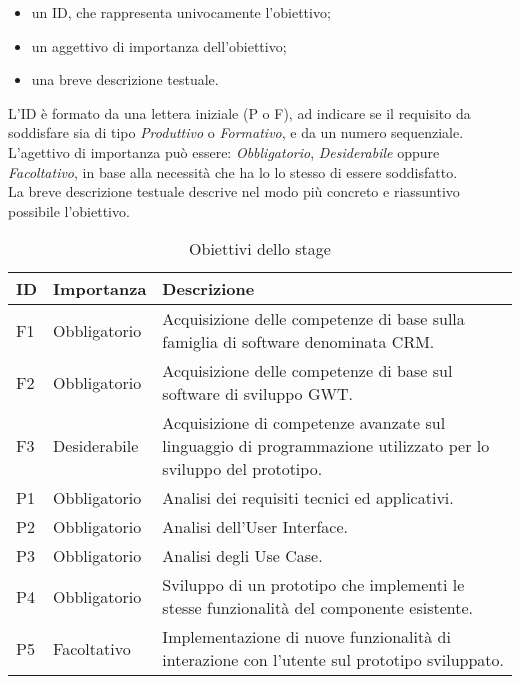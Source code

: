 \begin{itemize}
	\item un ID, che rappresenta univocamente l'obiettivo;
	\item un aggettivo di importanza dell'obiettivo;
	\item una breve descrizione testuale.
\end{itemize}

L'ID è formato da una lettera iniziale (P o F), ad indicare se il requisito da soddisfare sia di tipo \emph{Produttivo} o \emph{Formativo}, e da un numero sequenziale.\\
L'agettivo di importanza può essere: \emph{Obbligatorio}, \emph{Desiderabile} oppure \emph{Facoltativo}, in base alla necessità che ha lo lo stesso di essere soddisfatto.\\
La breve descrizione testuale descrive nel modo più concreto e riassuntivo possibile l'obiettivo.\\

\begin{table}[h]
	\centering
	\caption{Obiettivi dello stage}
	\label{tab:obiettivi}
	\begin{tabular}{|l|p{4cm}|p{8cm}|}
		\hline
		\rule[-4mm]{0mm}{1cm}
		ID & Importanza & Descrizione \\
		\hline
		\rule[-3mm]{0mm}{0.8cm}
		F1 & Obbligatorio & Acquisizione delle competenze di base sulla famiglia di software denominata CRM.\\
		\hline
		\rule[-3mm]{0mm}{0.8cm}
		F2 & Obbligatorio & Acquisizione delle competenze di base sul software di sviluppo GWT.\\
		\hline
		\rule[-3mm]{0mm}{0.8cm}
		F3 & Desiderabile & Acquisizione di competenze avanzate sul linguaggio di programmazione utilizzato per lo sviluppo del prototipo.\\
		\hline
		\rule[-3mm]{0mm}{0.8cm}
		P1 & Obbligatorio & Analisi dei requisiti tecnici ed applicativi.\\
		\hline
		\rule[-3mm]{0mm}{0.8cm}
		P2 & Obbligatorio & Analisi dell'User Interface.\\
		\hline
		\rule[-3mm]{0mm}{0.8cm}
		P3 & Obbligatorio & Analisi degli Use Case.\\
		\hline
		\rule[-3mm]{0mm}{0.8cm}
		P4 & Obbligatorio & Sviluppo di un prototipo che implementi le stesse funzionalità del componente esistente.\\
		\hline
		\rule[-3mm]{0mm}{0.8cm}
		P5 & Facoltativo & Implementazione di nuove funzionalità di interazione con l'utente sul prototipo sviluppato.\\
		\hline
	\end{tabular}
\end{table}

